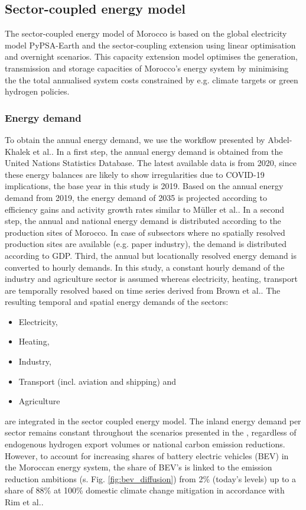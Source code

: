 
\subsection*{Sector-coupled energy model}
\label{subsec:moroccan_model}
The sector-coupled energy model of Morocco is based on the global electricity model  PyPSA-Earth \cite{Parzen2023} and the sector-coupling extension \cite{Abdel-Khalek2024} using linear optimisation and overnight scenarios. This capacity extension model optimises the generation, transmission and storage capacities of Morocco's energy system by minimising the the total annualised system costs constrained by e.g. climate targets or green hydrogen policies.

\subsubsection*{Energy demand}
To obtain the annual energy demand, we use the workflow presented by Abdel-Khalek et al.\cite{Abdel-Khalek2024}. In a first step, the annual energy demand is obtained from the United Nations Statistics Database\cite{unstats2023}. The latest available data is from 2020, since these energy balances are likely to show irregularities due to COVID-19 implications, the base year in this study is 2019. Based on the annual energy demand from 2019, the energy demand of 2035 is projected according to efficiency gains and activity growth rates similar to M{\"u}ller et al.\cite{Muller2023}.
In a second step, the annual and national energy demand is distributed according to the production sites of Morocco.
In case of subsectors where no spatially resolved production sites are available (e.g. paper industry), the demand is distributed according to GDP.
Third, the annual but locationally resolved energy demand is converted to hourly demands. In this study, a constant hourly demand of the industry and agriculture sector is assumed whereas electricity, heating, transport are temporally resolved based on time series derived from Brown et al.\cite{Brown2018a}. The resulting temporal and spatial energy demands of the sectors:
\begin{itemize}
    \item Electricity,
    \item Heating,
    \item Industry,
    \item Transport (incl. aviation and shipping) and
    \item Agriculture
\end{itemize}
are integrated in the sector coupled energy model. The inland energy demand per sector remains constant throughout the scenarios presented in the , regardless of endogenous hydrogen export volumes or national carbon emission reductions. However, to account for increasing shares of battery electric vehicles (BEV) in the Moroccan energy system, the share of BEV's is linked to the emission reduction ambitions (s. Fig. \ref{fig:bev_diffusion}) from 2\% (today's levels) up to a share of 88\% at 100\% domestic climate change mitigation in accordance with Rim et al.\cite{Rim2021}.


